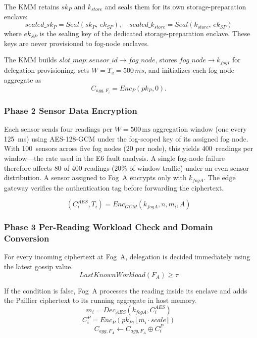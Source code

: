 \documentclass[conference]{IEEEtran}
\begin{document}
    The KMM retains $sk_P$ and $k_{store}$ and seals them for its own storage-preparation enclave:
    \begin{equation}
    sealed\_sk_P = Seal(sk_P,\, ek_{SP}), \quad sealed\_k_{store} = Seal(k_{store},\, ek_{SP})
    \end{equation}
    where $ek_{SP}$ is the sealing key of the dedicated storage-preparation enclave. These keys are never provisioned to fog-node enclaves.

    The KMM builds $slot\_map:sensor\_id\rightarrow fog\_node$, stores $fog\_node\rightarrow k_{fogI}$ for delegation provisioning, sets $W=T_g=500\,ms$, and initializes each fog node aggregate as
    \begin{equation}
    C_{agg,F_i} = Enc_P(pk_P,0).
    \end{equation}

    \subsubsection{\textbf{Phase 2 Sensor Data Encryption}}

    Each sensor sends four readings per $W=500\,\text{ms}$ aggregation window (one every 125~ms) using AES-128-GCM under the fog-scoped key of its assigned fog node. With 100~sensors across five fog nodes (20 per node), this yields 400~readings per window---the rate used in the E6 fault analysis. A single fog-node failure therefore affects 80 of 400 readings (20\% of window traffic) under an even sensor distribution. A sensor assigned to Fog~A encrypts only with $k_{fogA}$. The edge gateway verifies the authentication tag before forwarding the ciphertext.

    \begin{equation}
    (C_i^{AES},T_i) = Enc_{GCM}(k_{fogA}, n, m_i, A)
    \end{equation}

    \subsubsection{\textbf{Phase 3 Per-Reading Workload Check and Domain Conversion}}

    For every incoming ciphertext at Fog~A, delegation is decided immediately using the latest gossip value.
    \begin{equation}
    LastKnownWorkload(F_A) \geq \tau
    \end{equation}

    If the condition is false, Fog~A processes the reading inside its enclave and adds the Paillier ciphertext to its running aggregate in host memory.
    \begin{equation}
    m_i = Dec_{AES}(k_{fogA}, C_i^{AES})
    \end{equation}
    \begin{equation}
    C_i^P = Enc_P(pk_P, \lfloor m_i \cdot scale \rceil)
    \end{equation}
    \begin{equation}
    C_{agg,F_A} \leftarrow C_{agg,F_A} \oplus C_i^P
    \end{equation}
\end{document}
